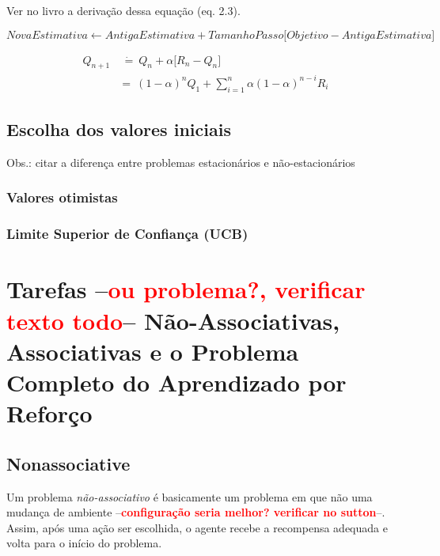 \documentclass{article}
\newcommand{\todo}[1]{ --\textcolor{red}{\textbf{#1}}--}
\begin{document}
            Ver no livro a derivação dessa equação (eq. 2.3).
            
            \begin{equation}
                NovaEstimativa \leftarrow AntigaEstimativa + TamanhoPasso \Big[ Objetivo - AntigaEstimativa \Big]
            \end{equation}
            
            \begin{equation}
            \begin{split}
                Q_{n+1} & \ \dot{=} \ Q_n + \alpha \Big[ R_n - Q_n \Big] \\
                & = \ (1 - \alpha)^n Q_1 + \sum_{i=1}^{n} \alpha (1 - \alpha)^{n - i} R_i
            \end{split}
            \end{equation}
            
        \subsection{Escolha dos valores iniciais}
            
            Obs.: citar a diferença entre problemas estacionários e não-estacionários
            
            \subsubsection{Valores otimistas}
            
            \subsubsection{Limite Superior de Confiança (UCB)}
            
    \section{Tarefas \todo{ou problema?, verificar texto todo} Não-Associativas, Associativas e o Problema Completo do Aprendizado por Reforço}
    
        \subsection{Nonassociative}
        
            Um problema \emph{não-associativo} é basicamente um problema em que não uma mudança de ambiente \todo{configuração seria melhor? verificar no sutton}. Assim, após uma ação ser escolhida, o agente recebe a recompensa adequada e volta para o início do problema. 
            
\end{document}
